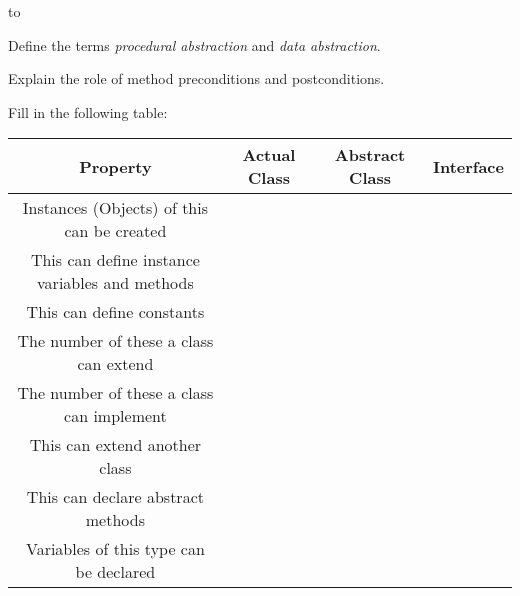 \documentclass[11pt]{exam}
\begin{document}
\begin{center} 
\end{center} 

\lstset{language=Python,numbers=left}

\vspace{0.1in} 
\hbox to \textwidth{Name:\enspace\hrulefill} 

\begin{questions}

\question[5] Define the terms {\it procedural abstraction} and {\it data abstraction}.
\vspace{2in}

\question[5] Explain the role of method preconditions and postconditions.
\vspace{2in}

\question[5] Fill in the following table: \newline
\begin{tabular}{|c|c|c|c|} \hline
	{\bf Property } & {\bf Actual Class} & {\bf Abstract Class} & {\bf Interface } \\ \hline \hline
	Instances (Objects) of this can be created & & & \\ \hline
	This can define instance variables and methods & & & \\ \hline
	This can define constants & & & \\ \hline
	The number of these a class can extend & & & \\ \hline
	The number of these a class can implement & & & \\ \hline
	This can extend another class & & & \\ \hline
	This can declare abstract methods & & & \\ \hline
	Variables of this type can be declared & & & \\ \hline
\end{tabular}


\end{questions}
\end{document}
